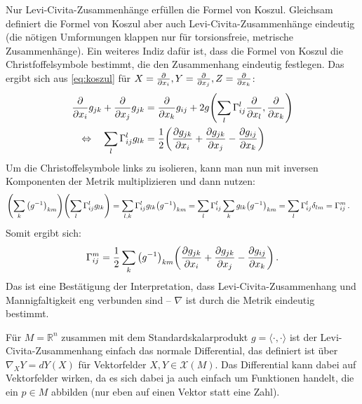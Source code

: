 \documentclass[../H_Analysis_main.tex]{subfiles}
\begin{document}
Nur Levi-Civita-Zusammenhänge erfüllen die Formel von Koszul. Gleichsam definiert die Formel von Koszul aber auch Levi-Civita-Zusammenhänge eindeutig (die nötigen Umformungen klappen nur für torsionsfreie, metrische Zusammenhänge). Ein weiteres Indiz dafür ist, dass die Formel von Koszul die Christfoffelsymbole bestimmt, die den Zusammenhang eindeutig festlegen. Das ergibt sich aus \eqref{eq:koszul} für $X = \pdv{x_i}, Y = \pdv{x_j}, Z = \pdv{x_k}$:
\begin{align*}
\pdv{x_i} g_{jk} + \pdv{x_j} g_{jk} &= \pdv{x_k} g_{ij} + 2 g\qty(\sum_l \Gamma_{ij}^l \pdv{x_l}, \pdv{x_k})%
\\
\Leftrightarrow \quad \sum_l \Gamma_{ij}^l g_{lk} &= \frac{1}{2} \qty(\pdv{g_{jk}}{x_i} + \pdv{g_{jk}}{x_j} - \pdv{g_{ij}}{x_k})
\end{align*}
Um die Christoffelsymbole links zu isolieren, kann man nun mit inversen Komponenten der Metrik multiplizieren und dann nutzen:
\begin{align*}
\qty(\sum_k \qty(g^{-1})_{km}) \qty(\sum_l \Gamma_{ij}^l g_{lk}) = \sum_{l, k} \Gamma_{ij}^l g_{lk} \qty(g^{-1})_{km} &= \sum_l \Gamma_{ij}^l \sum_k g_{lk} \qty(g^{-1})_{km} = \sum_l \Gamma_{ij}^l \delta_{lm} = \Gamma_{ij}^m \, .
\end{align*}
Somit ergibt sich:
\begin{equation}
\Gamma_{ij}^m = \frac{1}{2} \sum_k \qty(g^{-1})_{km} \qty(\pdv{g_{jk}}{x_i} + \pdv{g_{jk}}{x_j} - \pdv{g_{ij}}{x_k}) \, .
\end{equation}
Das ist eine Bestätigung der Interpretation, dass Levi-Civita-Zusammenhang und Mannigfaltigkeit eng verbunden sind -- $\nabla$ ist durch die Metrik eindeutig bestimmt.



\begin{bsp}
Für $M = \mathbb{R}^n$ zusammen mit dem Standardskalarprodukt $g = \langle \cdot, \cdot \rangle$ ist der Levi-Civita-Zusammenhang einfach das normale Differential, das definiert ist über $\nabla_X Y = dY(X)$ für Vektorfelder $X, Y \in \mathcal{X}(M)$. Das Differential kann dabei auf Vektorfelder wirken, da es sich dabei ja auch einfach um Funktionen handelt, die ein $p \in M$ abbilden (nur eben auf einen Vektor statt eine Zahl).
\end{bsp}
\end{document}
